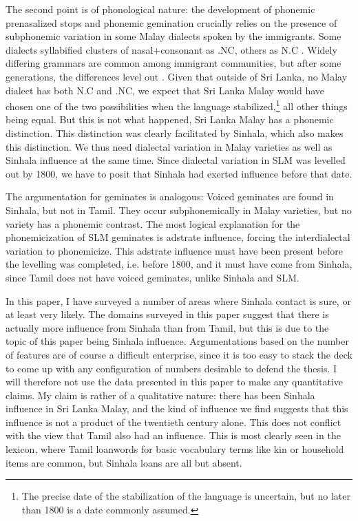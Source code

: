 \documentclass[a4paper,10pt]{article}
\begin{document}
The second point is of phonological nature: the development of phonemic prenasalized stops and phonemic gemination crucially relies on the presence of subphonemic variation in some Malay dialects spoken by the immigrants. Some dialects syllabified clusters of nasal+consonant as .NC, others as N.C . Widely differing grammars are common among immigrant communities, but after some generations, the differences level out \citep{Trudgill1986,Meshtrie1993}. Given that outside of Sri Lanka, no Malay dialect has both N.C and .NC, we expect that Sri Lanka Malay would have chosen one of the two possibilities when the language stabilized,\footnote{The 
 precise date of the stabilization of the language is uncertain, but no later than 1800 is a date commonly assumed.
} 
all other things being equal. But this is not what happened, Sri Lanka Malay has a phonemic distinction. This distinction was clearly facilitated by Sinhala, which also makes this distinction. We thus need dialectal variation in Malay varieties as well as Sinhala influence at the same time. Since dialectal variation in SLM was levelled out by 1800, we have to posit that Sinhala had exerted influence before that date.

The argumentation for geminates is analogous: Voiced geminates are found in Sinhala, but not in Tamil. They occur subphonemically in Malay varieties, but no variety has a phonemic contrast. The most logical explanation for the phonemicization of SLM geminates is adstrate influence, forcing the interdialectal variation to phonemicize. This adstrate influence must have been present before the levelling was completed, i.e. before 1800, and it must have come from Sinhala, since Tamil does not have voiced geminates, unlike Sinhala and SLM.


In this paper, I have surveyed a number of areas where Sinhala contact is sure, or at least very likely. The domains surveyed in this paper suggest that there is actually more influence from Sinhala than from Tamil, but this is due to the topic of this paper being Sinhala influence. Argumentations based on the number of features are of course a difficult enterprise, since it is too easy to stack the deck to come up with any configuration of numbers desirable to defend the thesis. I will therefore not use the data presented in this paper to make any quantitative claims. My claim is rather of a qualitative nature: there has been Sinhala influence in Sri Lanka Malay, and the kind of influence we find suggests that this influence is not a product of the twentieth century alone. This does not conflict with the view that Tamil also had an influence. This is most clearly seen in the lexicon, where Tamil loanwords for basic vocabulary terms like kin or household items are common, but Sinhala loans are all but absent. 
\end{document}
